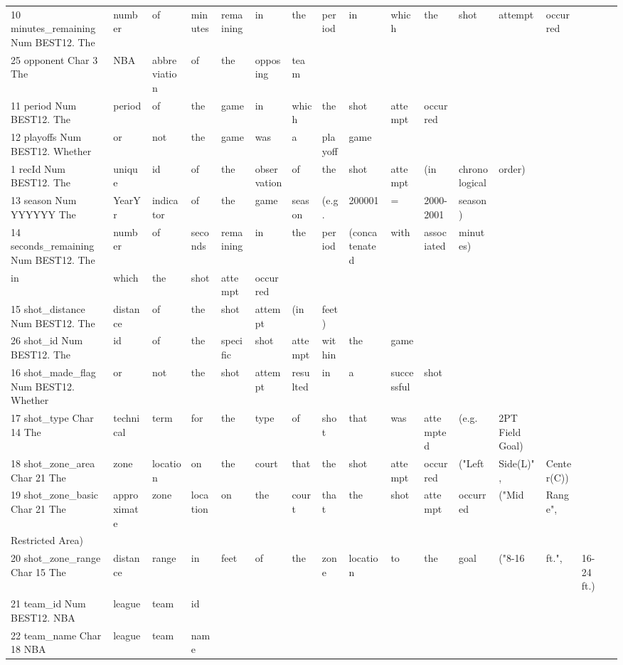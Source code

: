 \begin{table}[h]
\begin{tabular}{llllllllllllllll}
    10	minutes\_remaining	Num	BEST12.	The & number & of & minutes & remaining & in & the & period & in & which & the & shot & attempt & occurred &  &  \\
    25	opponent	Char	3	The & NBA & abbreviation & of & the & opposing & team &  &  &  &  &  &  &  &  &  \\
    11	period	Num	BEST12.	The & period & of & the & game & in & which & the & shot & attempt & occurred &  &  &  &  &  \\
    12	playoffs	Num	BEST12.	Whether & or & not & the & game & was & a & playoff & game &  &  &  &  &  &  &  \\
    1	recId	Num	BEST12.	The & unique & id & of & the & observation & of & the & shot & attempt & (in & chronological & order) &  &  &  \\
    13	season	Num	YYYYYY	The & YearYr & indicator & of & the & game & season & (e.g. & 200001 & = & 2000-2001 & season) &  &  &  &  \\
    14	seconds\_remaining	Num	BEST12.	The & number & of & seconds & remaining & in & the & period & (concatenated & with & associated & minutes) &  &  &  &  \\
    in & which & the & shot & attempt & occurred &  &  &  &  &  &  &  &  &  &  \\
    15	shot\_distance	Num	BEST12.	The & distance & of & the & shot & attempt & (in & feet) &  &  &  &  &  &  &  &  \\
    26	shot\_id	Num	BEST12.	The & id & of & the & specific & shot & attempt & within & the & game &  &  &  &  &  &  \\
    16	shot\_made\_flag	Num	BEST12.	Whether & or & not & the & shot & attempt & resulted & in & a & successful & shot &  &  &  &  &  \\
    17	shot\_type	Char	14	The & technical & term & for & the & type & of & shot & that & was & attempted & (e.g. & 2PT Field Goal) &  &  &  \\
    18	shot\_zone\_area	Char	21	The & zone & location & on & the & court & that & the & shot & attempt & occurred & ("Left & Side(L)", & Center(C)) &  &  \\
    19	shot\_zone\_basic	Char	21	The & approximate & zone & location & on & the & court & that & the & shot & attempt & occurred & ("Mid & Range", &  &  \\
    Restricted Area) &  &  &  &  &  &  &  &  &  &  &  &  &  &  &  \\
    20	shot\_zone\_range	Char	15	The & distance & range & in & feet & of & the & zone & location & to & the & goal & ("8-16 & ft.", & 16-24 ft.) &  \\
    21	team\_id	Num	BEST12.	NBA & league & team & id &  &  &  &  &  &  &  &  &  &  &  &  \\
    22	team\_name	Char	18	NBA & league & team & name &  &  &  &  &  &  &  &  &  &  &  &
    \end{tabular}
    \end{table}

